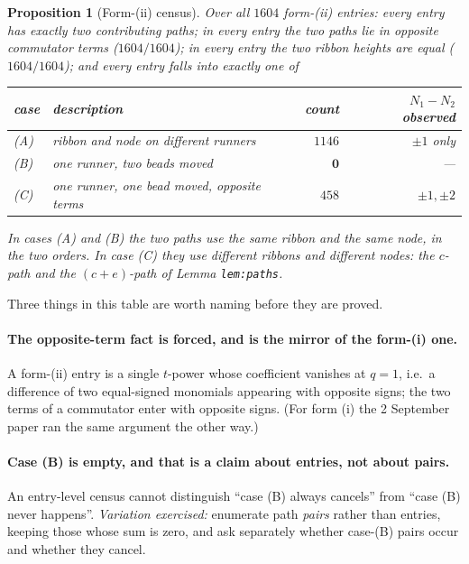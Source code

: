 \documentclass[11pt]{article}
\newtheorem{proposition}[theorem]{Proposition}
\theoremstyle{definition}
\theoremstyle{remark}
\begin{document}
\begin{proposition}[Form-(ii) census]\label{prop:census2}
Over all $1604$ form-(ii) entries: every entry has exactly two contributing paths; in
every entry the two paths lie in \emph{opposite} commutator terms ($1604/1604$); in
every entry the two ribbon heights are equal ($1604/1604$); and every entry falls into
exactly one of
\begin{center}
\begin{tabular}{llrr}
\hline
case & description & count & $N_1-N_2$ observed\\
\hline
(A) & ribbon and node on different runners & $1146$ & $\pm1$ only\\
(B) & one runner, two beads moved & $\mathbf{0}$ & ---\\
(C) & one runner, one bead moved, opposite terms & $458$ & $\pm1,\pm2$\\
\hline
\end{tabular}
\end{center}
In cases (A) and (B) the two paths use the \emph{same} ribbon and the \emph{same} node,
in the two orders. In case (C) they use different ribbons and different nodes: the
$c$-path and the $(c+e)$-path of Lemma \texttt{lem:paths}.
\end{proposition}

Three things in this table are worth naming before they are proved.

\paragraph{The opposite-term fact is forced, and is the mirror of the form-(i) one.}
A form-(ii) entry is a single $t$-power whose coefficient vanishes at $q=1$, i.e.\ a
difference of two equal-signed monomials appearing with opposite signs; the two terms of
a commutator enter with opposite signs. (For form (i) the 2 September paper ran the same
argument the other way.)

\paragraph{Case (B) is empty, and that is a claim about entries, not about pairs.}
An entry-level census cannot distinguish ``case (B) always cancels'' from ``case (B)
never happens''. \emph{Variation exercised:} enumerate path \emph{pairs} rather than
entries, keeping those whose sum is zero, and ask separately whether case-(B) pairs occur
and whether they cancel.
\end{document}
